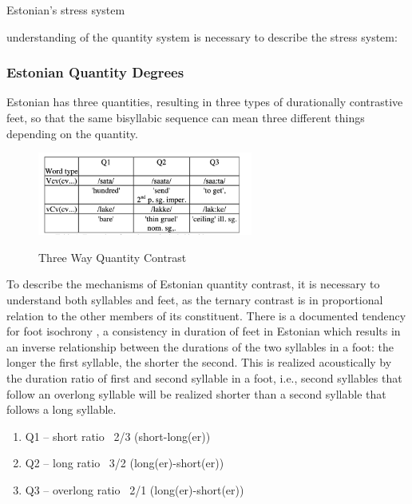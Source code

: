 \documentclass[12pt]{article}
\begin{document}
Estonian's stress system 

understanding of the quantity system is necessary to describe the stress system: 

\subsubsection{Estonian Quantity Degrees} 


Estonian has three quantities, resulting in three types of durationally contrastive feet, so that the same bisyllabic sequence can mean three different things depending on the quantity. 
 \begin{figure}[htbp]
 \begin{center}
 \includegraphics[width=200pt]{figures/Quantity.png}\\

 \caption{Three Way Quantity Contrast {\cite{traunmullerEffectLocalSpeaking2003}}}
 \label{quant_cont}
 \end{center}
 \end{figure}
 
 To describe the mechanisms of Estonian quantity contrast, it is necessary to understand both syllables and feet, as the ternary contrast is in proportional relation to the other members of its constituent\cite{lehisteProsodicChangeProgress2003}. 
 There is a documented tendency for foot isochrony \cite{ foxDiscriminationDurationRatios1987,foxDiscriminationDurationRatios1989, lehisteFunctionQuantityFinnish1965}, a consistency in duration of feet in Estonian which results in an inverse relationship between the durations of the two syllables in a foot: the longer the first syllable, the shorter the second. This is realized acoustically by the duration ratio of first and second syllable in a foot, i.e., second syllables that follow an overlong syllable will be realized shorter than a second syllable that follows a long syllable. \\
 \begin{enumerate}
 	\item Q1 – short 		ratio ~2/3	(short-long(er))
	\item Q2 – long		ratio ~3/2	(long(er)-short(er))
	\item Q3 – overlong		ratio ~2/1 	(long(er)-short(er)) 
\end{enumerate}
\end{document}
